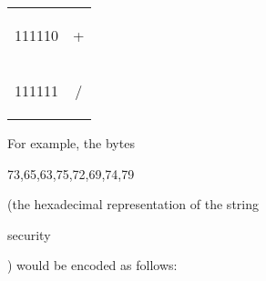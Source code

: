 \begin{tabular}{|c|c|}
  \begin{code}111110\end{code} & \begin{code}+\end{code} \\
  \begin{code}111111\end{code} & \begin{code}/\end{code} \\ \hline
\end{tabular}

For example, the bytes \begin{code}73,65,63,75,72,69,74,79\end{code}
(the hexadecimal representation of the string \begin{code}security\end{code})
would be encoded as follows:
